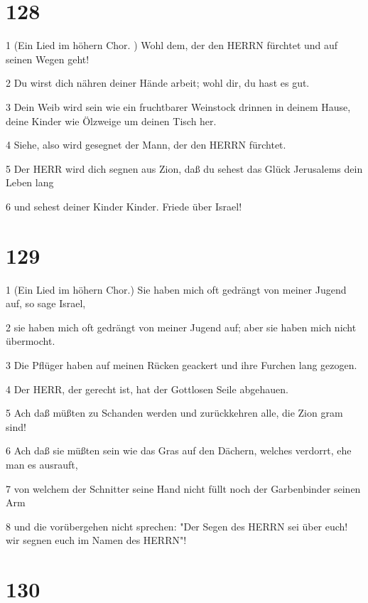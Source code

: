 \chapter{128}

\par 1 (Ein Lied im höhern Chor. ) Wohl dem, der den HERRN fürchtet und auf seinen Wegen geht!
\par 2 Du wirst dich nähren deiner Hände arbeit; wohl dir, du hast es gut.
\par 3 Dein Weib wird sein wie ein fruchtbarer Weinstock drinnen in deinem Hause, deine Kinder wie Ölzweige um deinen Tisch her.
\par 4 Siehe, also wird gesegnet der Mann, der den HERRN fürchtet.
\par 5 Der HERR wird dich segnen aus Zion, daß du sehest das Glück Jerusalems dein Leben lang
\par 6 und sehest deiner Kinder Kinder. Friede über Israel!

\chapter{129}

\par 1 (Ein Lied im höhern Chor.) Sie haben mich oft gedrängt von meiner Jugend auf, so sage Israel,
\par 2 sie haben mich oft gedrängt von meiner Jugend auf; aber sie haben mich nicht übermocht.
\par 3 Die Pflüger haben auf meinen Rücken geackert und ihre Furchen lang gezogen.
\par 4 Der HERR, der gerecht ist, hat der Gottlosen Seile abgehauen.
\par 5 Ach daß müßten zu Schanden werden und zurückkehren alle, die Zion gram sind!
\par 6 Ach daß sie müßten sein wie das Gras auf den Dächern, welches verdorrt, ehe man es ausrauft,
\par 7 von welchem der Schnitter seine Hand nicht füllt noch der Garbenbinder seinen Arm
\par 8 und die vorübergehen nicht sprechen: "Der Segen des HERRN sei über euch! wir segnen euch im Namen des HERRN"!

\chapter{130}

